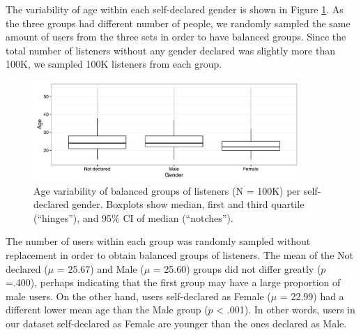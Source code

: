 
The variability of age within each self-declared gender is shown in Figure \ref{fig:gender_vs_age}. As the three groups had different number of people, we randomly sampled the same amount of users from the three sets in order to have balanced groups. Since the total number of listeners without any gender declared was slightly more than 100K, we sampled 100K listeners from each group.


\begin{figure}[!h]
\centering
\includegraphics[width=0.90\textwidth]{gender_vs_age.pdf}				
\caption[Age variability of balanced groups of listeners per gender]{Age variability of balanced groups of listeners (N = 100K) per self-declared gender. Boxplots show median, first and third quartile (``hinges''), and 95\% CI of median (``notches'').}
\label{fig:gender_vs_age}
\end{figure}


The number of users within each group was randomly sampled without replacement in order to obtain balanced groups of listeners. 
The mean of the Not declared ($\mu$ = 25.67) and Male ($\mu$ = 25.60) groups did not differ greatly ($p$=.400), perhaps indicating that the first group may have a large proportion of male users. On the other hand, users self-declared as Female ($\mu$ = 22.99) had a different lower mean age than the Male group ($p$ < .001). In other words, users in our dataset self-declared as Female are younger than the ones declared as Male.





